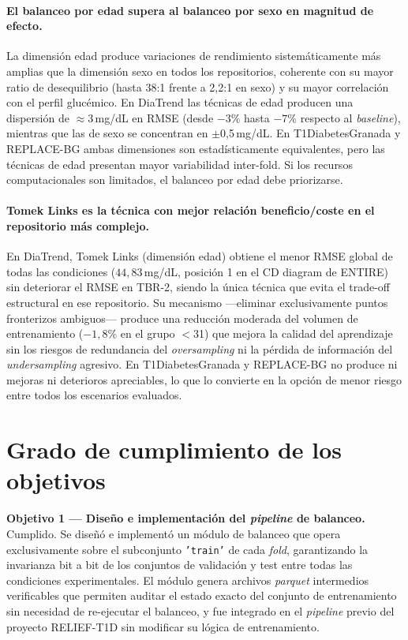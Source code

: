 \paragraph{El balanceo por edad supera al balanceo por sexo en magnitud
de efecto.}
La dimensión edad produce variaciones de rendimiento sistemáticamente
más amplias que la dimensión sexo en todos los repositorios, coherente
con su mayor ratio de desequilibrio (hasta 38:1 frente a 2{,}2:1 en
sexo) y su mayor correlación con el perfil glucémico. En DiaTrend las
técnicas de edad producen una dispersión de $\approx$3\,mg/dL en RMSE
(desde $-3\%$ hasta $-7\%$ respecto al \textit{baseline}), mientras que
las de sexo se concentran en $\pm$0{,}5\,mg/dL. En T1DiabetesGranada
y REPLACE-BG ambas dimensiones son estadísticamente equivalentes, pero
las técnicas de edad presentan mayor variabilidad inter-fold. Si los
recursos computacionales son limitados, el balanceo por edad debe
priorizarse.

\paragraph{Tomek Links es la técnica con mejor relación
beneficio/coste en el repositorio más complejo.}
En DiaTrend, Tomek Links (dimensión edad) obtiene el menor RMSE global
de todas las condiciones ($44{,}83$\,mg/dL, posición 1 en el CD diagram
de ENTIRE) sin deteriorar el RMSE en TBR-2, siendo la única técnica que
evita el trade-off estructural en ese repositorio. Su mecanismo ---eliminar
exclusivamente puntos fronterizos ambiguos--- produce una reducción
moderada del volumen de entrenamiento ($-1{,}8\%$ en el grupo $<$31)
que mejora la calidad del aprendizaje sin los riesgos de redundancia del
\textit{oversampling} ni la pérdida de información del \textit{undersampling}
agresivo. En T1DiabetesGranada y REPLACE-BG no produce ni mejoras ni
deterioros apreciables, lo que lo convierte en la opción de menor riesgo
entre todos los escenarios evaluados.

\section{Grado de cumplimiento de los objetivos}
\label{sec:cumplimiento_objetivos}

\textbf{Objetivo 1 — Diseño e implementación del \textit{pipeline} de
balanceo.} Cumplido. Se diseñó e implementó un módulo de balanceo que
opera exclusivamente sobre el subconjunto \texttt{'train'} de cada
\textit{fold}, garantizando la invarianza bit a bit de los conjuntos de
validación y test entre todas las condiciones experimentales. El módulo
genera archivos \textit{parquet} intermedios verificables que permiten
auditar el estado exacto del conjunto de entrenamiento sin necesidad de
re-ejecutar el balanceo, y fue integrado en el \textit{pipeline} previo
del proyecto RELIEF-T1D sin modificar su lógica de entrenamiento.


